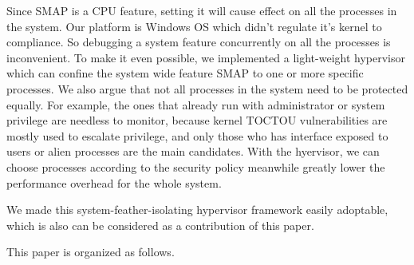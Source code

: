 
Since SMAP is a CPU feature, setting it will cause effect on all the processes in the system. Our platform is Windows OS which didn't regulate it's kernel to compliance. So debugging a system feature concurrently on all the processes is inconvenient. To make it even possible, we implemented a light-weight hypervisor which can confine the system wide feature SMAP to one or more specific processes. We also argue that not all processes in the system need to be protected equally. For example, the ones that already run with administrator or system privilege are needless to monitor, because kernel TOCTOU vulnerabilities are mostly used to escalate privilege, and only those who has interface exposed to users or alien processes are the main candidates. With the hyervisor, we can choose processes according to the security policy meanwhile greatly lower the performance overhead for the whole system. 

We made this system-feather-isolating hypervisor framework easily adoptable, which is also can be considered as a contribution of this paper.


This paper is organized as follows. 
